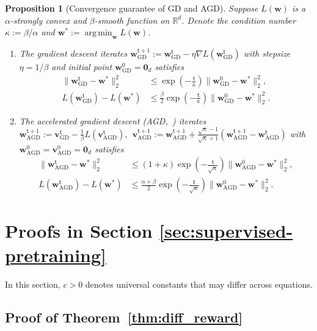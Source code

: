 \documentclass[10pt]{article}
\newtheorem{proposition}[theorem]{Proposition}
\DeclareMathOperator*{\argmin}{arg\,min}
\newcommand{\<}{\left\langle}
\renewcommand{\>}{\right\rangle}
\newcommand{\bzero}{{\mathbf 0}}
\newcommand{\R}{\mathbb{R}}
\newcommand{\GD}{{\mathrm{GD}}}
\newcommand{\AGD}{{\mathrm{AGD}}}
\newcommand{\sst}{{\mathsf{t}}}
\def\bv{{\mathbf v}}
\def\bw{{\mathbf w}}
\begin{document}
\begin{proposition}[Convergence guarantee of GD and AGD]\label{prop:conv_gd_agd}
Suppose $L(\bw)$ is a $\alpha$-strongly convex and $\beta$-smooth function on $\R^d$. Denote the condition number $\kappa:=\beta/\alpha$ and $\bw^*:=\argmin_{\bw}L(\bw)$.
\begin{enumerate}
\item[(a).]
The gradient descent iterates $\bw^{\sst+1}_{\GD}:=\bw^{\sst}_{\GD}-\eta\nabla L(\bw^{\sst}_{\GD})$ with stepsize $\eta=1/\beta$ and initial point $\bw^{0}_{\GD}=\bzero_d$ satisfies
\begin{align*}
    \|\bw^{\sst}_{\GD}-\bw^*\|_2^2
    &\leq\exp(-\frac{\sst}{\kappa}) \|\bw^{0}_{\GD}-\bw^*\|_2^2,
    \\
    L(\bw^{\sst}_{\GD})-L(\bw^*)
    &\leq \frac{\beta}{2} \exp(-\frac{\sst}{\kappa})\|\bw^{0}_{\GD}-\bw^*\|_2^2.
\end{align*}
    \item [(b).]
    The accelerated gradient descent (AGD,~\cite{nesterov2003introductory}) iterates $\bw^{\sst+1}_{\AGD}:=\bv^{\sst}_{\GD}-\frac{1}{\beta} L(\bv^{\sst}_{\AGD}),~~ \bv^{\sst+1}_{\AGD}:=\bw^{\sst+1}_{\AGD}+\frac{\sqrt{\kappa}-1}{\sqrt{\kappa}+1}(\bw^{\sst+1}_{\AGD}-\bw^{\sst}_{\AGD})$ with $\bw^{0}_{\AGD}=\bv^{0}_{\AGD}=\bzero_d$ satisfies
    \begin{align*}
    \|\bw^{\sst}_{\AGD}-\bw^*\|_2^2
    &\leq(1+\kappa)\exp(-\frac{\sst}{\sqrt{\kappa}}) \|\bw^{0}_{\AGD}-\bw^*\|_2^2,
    \\
    L(\bw^{\sst}_{\AGD})-L(\bw^*)
    &\leq \frac{\alpha+\beta}{2} \exp(-\frac{\sst}{\sqrt\kappa})\|\bw^{0}_{\AGD}-\bw^*\|_2^2.
\end{align*}
\end{enumerate}
\end{proposition}
\section{Proofs in Section \ref{sec:supervised-pretraining}}
In this section, $c>0$ denotes universal constants that may differ across equations.
\subsection{Proof of Theorem~\ref{thm:diff_reward}}\label{sec:pf_thm:diff_reward}
\end{document}
